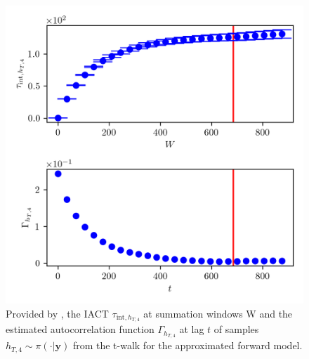 \begin{figure}[ht!]
	\centering
	\includegraphics{UwerrTauIntTWalk12.png}
	\caption[IACT and autocorrelation function of samples $h_{T,4} \sim \pi(\cdot|\bm{y})$, for approximated model.]{Provided by \cite{drikHesse}, the IACT $\tau_{\text{int},h_{T,4}}$ at summation windows W and the estimated autocorrelation function $\Gamma_{h_{T,4}}$ at lag $t$ of samples $h_{T,4} \sim \pi( \cdot| \bm{y})$ from the t-walk for the approximated forward model.}
	\label{fig:TWalkIATC13}
\end{figure}

